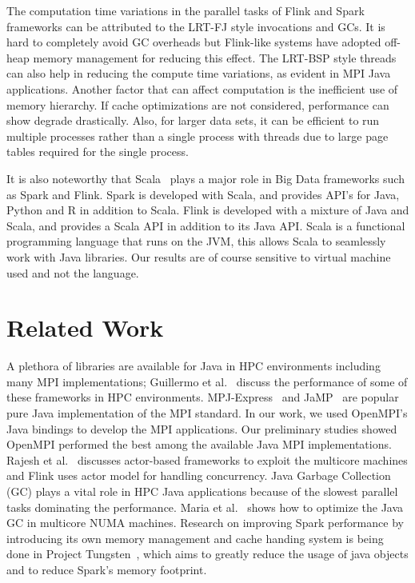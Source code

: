 \documentclass[10pt, conference, compsocconf]{IEEEtran}
\begin{document}
The computation time variations in the parallel tasks of Flink and Spark frameworks can be attributed to the \ac{LRT-FJ} style invocations and \acp{GC}. It is hard to completely avoid \ac{GC} overheads but Flink-like systems have adopted off-heap memory management for reducing this effect. The \ac{LRT-BSP} style threads can also help in reducing the compute time variations, as evident in \ac{MPI} Java applications. Another factor that can affect computation is the inefficient use of memory hierarchy. If cache optimizations are not considered, performance can show degrade drastically. Also, for larger data sets, it can be efficient to run multiple processes rather than a single process with threads due to large page tables required for the single process.   

It is also noteworthy that Scala~\cite{scalalang} plays a major role in Big Data frameworks such as Spark and Flink. Spark is developed with Scala, and provides \ac{API}'s for Java, Python and R in addition to Scala. Flink is developed with a mixture of Java and Scala, and provides a Scala \ac{API} in addition to its Java \ac{API}. Scala is a functional programming language that runs on the \ac{JVM}, this allows Scala to seamlessly work with Java libraries. Our results are of course sensitive to virtual machine used and not the language.


\section{Related Work} \label{sec:related}
A plethora of libraries are available for Java in \ac{HPC} environments including many \ac{MPI} implementations; Guillermo et al.~\cite{taboada2013java} discuss the performance of some of these frameworks in \ac{HPC} environments. MPJ-Express~\cite{baker2006mpj} and JaMP~\cite{klemm2007jamp} are popular pure Java implementation of the \ac{MPI} standard. In our work, we used OpenMPI's Java bindings to develop the \ac{MPI} applications. Our preliminary studies showed OpenMPI performed the best among the available Java \ac{MPI} implementations. Rajesh et al.~\cite{karmani2009actor} discusses actor-based frameworks to exploit the multicore machines and Flink uses actor model for handling concurrency. Java Garbage Collection (\ac{GC}) plays a vital role in \ac{HPC} Java applications because of the slowest parallel tasks dominating the performance. Maria et al.~\cite{carpen2015performance} shows how to optimize the Java \ac{GC} in multicore \ac{NUMA} machines. Research on improving Spark performance by introducing its own memory management and cache handing system is being done in Project Tungsten~\cite{tungsten}, which aims to greatly reduce the usage of java objects and to reduce Spark's memory footprint. 
\end{document}
